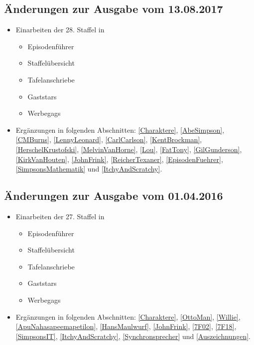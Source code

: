 \documentclass[pagesize,twoside,german]{scrbook}
\begin{document}
\subsection*{Änderungen zur Ausgabe vom 13.08.2017}
\begin{itemize}
	\item Einarbeiten der 28. Staffel in
	\begin{itemize}
		\item Episodenführer
		\item Staffelübersicht
		\item Tafelanschriebe
		\item Gaststars
		\item Werbegags
	\end{itemize}
	\item Ergänzungen in folgenden Abschnitten: \ref{Charaktere}, \ref{AbeSimpson}, \ref{CMBurns}, \ref{LennyLeonard}, \ref{CarlCarlson}, \ref{KentBrockman}, \ref{HerschelKrustofski}, \ref{MelvinVanHorne}, \ref{Lou}, \ref{FatTony}, \ref{GilGunderson}, \ref{KirkVanHouten}, \ref{JohnFrink}, \ref{ReicherTexaner}, \ref{EpisodenFuehrer}, \ref{SimpsonsMathematik} und \ref{ItchyAndScratchy}.
\end{itemize}

\subsection*{Änderungen zur Ausgabe vom 01.04.2016}
\begin{itemize}
	\item Einarbeiten der 27. Staffel in
	\begin{itemize}
		\item Episodenführer
		\item Staffelübersicht
		\item Tafelanschriebe
		\item Gaststars
		\item Werbegags
	\end{itemize}
	\item Ergänzungen in folgenden Abschnitten: \ref{Charaktere}, \ref{OttoMan}, \ref{Willie}, \ref{ApuNahasapeemapetilon}, \ref{HansMaulwurf}, \ref{JohnFrink}, \ref{7F02}, \ref{7F18}, \ref{SimpsonsIT}, \ref{ItchyAndScratchy}, \ref{Synchronsprecher} und \ref{Auszeichnungen}.
\end{itemize}
\end{document}
